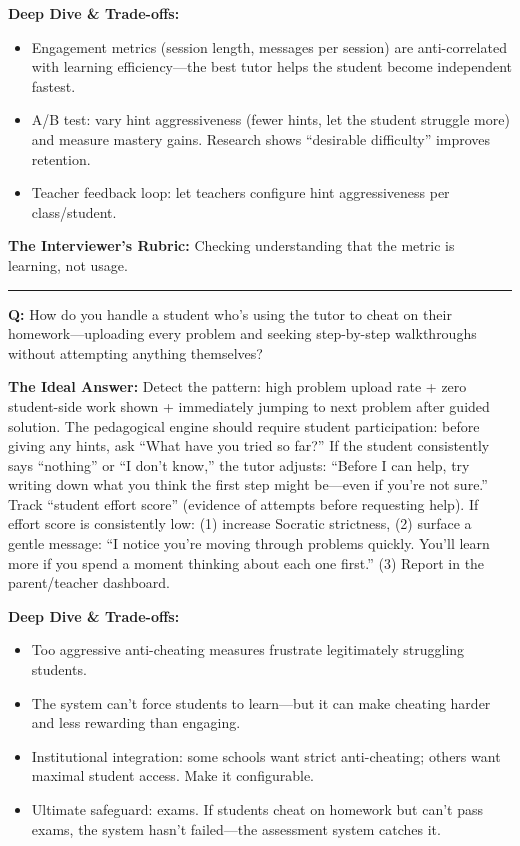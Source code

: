 \textbf{Deep Dive \& Trade-offs:}
\begin{itemize}
  \item Engagement metrics (session length, messages per session) are anti-correlated with learning efficiency---the best tutor helps the student become independent fastest.
  \item A/B test: vary hint aggressiveness (fewer hints, let the student struggle more) and measure mastery gains. Research shows ``desirable difficulty'' improves retention.
  \item Teacher feedback loop: let teachers configure hint aggressiveness per class/student.
\end{itemize}

\textbf{The Interviewer's Rubric:} Checking understanding that the metric is learning, not usage.

\bigskip\hrule\bigskip

\textbf{Q:} How do you handle a student who's using the tutor to cheat on their homework---uploading every problem and seeking step-by-step walkthroughs without attempting anything themselves?

\textbf{The Ideal Answer:} Detect the pattern: high problem upload rate + zero student-side work shown + immediately jumping to next problem after guided solution. The pedagogical engine should require student participation: before giving any hints, ask ``What have you tried so far?'' If the student consistently says ``nothing'' or ``I don't know,'' the tutor adjusts: ``Before I can help, try writing down what you think the first step might be---even if you're not sure.'' Track ``student effort score'' (evidence of attempts before requesting help). If effort score is consistently low: (1) increase Socratic strictness, (2) surface a gentle message: ``I notice you're moving through problems quickly. You'll learn more if you spend a moment thinking about each one first.'' (3) Report in the parent/teacher dashboard.

\textbf{Deep Dive \& Trade-offs:}
\begin{itemize}
  \item Too aggressive anti-cheating measures frustrate legitimately struggling students.
  \item The system can't force students to learn---but it can make cheating harder and less rewarding than engaging.
  \item Institutional integration: some schools want strict anti-cheating; others want maximal student access. Make it configurable.
  \item Ultimate safeguard: exams. If students cheat on homework but can't pass exams, the system hasn't failed---the assessment system catches it.
\end{itemize}

